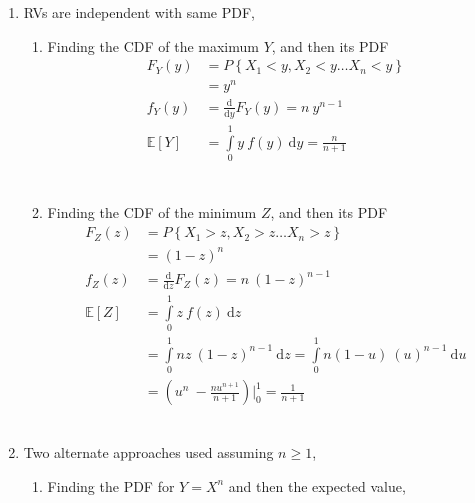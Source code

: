 \begin{enumerate}
	
	\item RVs are independent with same PDF, \\
	
		\begin{enumerate}
			\item Finding the CDF of the maximum $ Y $, and then its PDF\\
			\begin{align}
				F_Y (y) &= P\left\{X_1 < y, X_2 < y \dots X_n < y\right\} \nonumber \\
				&= y^n \\
				f_Y (y) &= \frac{\mathrm{d}}{\mathrm{d} y} F_Y (y) = n\ y^{n-1} \\
				\mathbb{E}[Y] &= \int\limits_{0}^{1} y\ f(y)\ \mathrm{d}y = \frac{n}{n+1} \\
			\end{align} \\
			
			\item Finding the CDF of the minimum $ Z $, and then its PDF\\
			\begin{align}
				F_Z (z) &= P\left\{X_1 > z, X_2 > z \dots X_n > z\right\} \nonumber \\
				&= (1-z)^n \\
				f_Z (z) &= \frac{\mathrm{d}}{\mathrm{d} z} F_Z (z) = n\ (1 - z)^{n-1} \\
				\mathbb{E}[Z] &= \int\limits_{0}^{1} z\ f(z)\ \mathrm{d}z \nonumber \\
				&= \int\limits_{0}^{1} nz\ (1 - z)^{n-1}\ \mathrm{d}z = \int\limits_{0}^{1} n(1 - u)\ (u)^{n-1}\ \mathrm{d}u \nonumber \\
				&= \left(u^n\ - \frac{n u^{n+1}}{n+1}\right)  \Big|_0^1 = \frac{1}{n+1}
			\end{align}\\
			
		\end{enumerate}
	
	
	\item Two alternate approaches used assuming $ n \geq 1 $, \\
	
		\begin{enumerate}
			
			\item Finding the PDF for $ Y = X^n $ and then the expected value,\\
			

\end{enumerate}
\end{enumerate}
